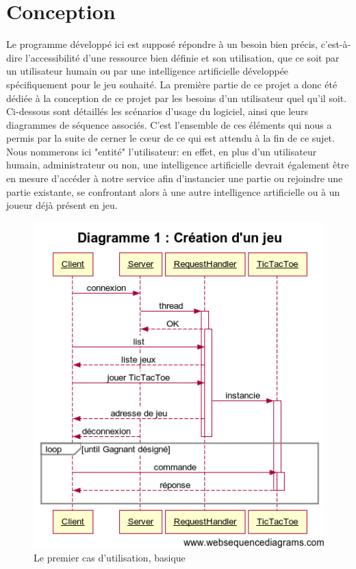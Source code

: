 \chapter{Conception}

Le programme développé ici est supposé répondre à un besoin bien précis, c'est-à-dire l'accessibilité d'une ressource bien définie et son utilisation, que ce soit par un utilisateur humain ou par une intelligence artificielle développée spécifiquement pour le jeu souhaité. La première partie de ce projet a donc été dédiée à la conception de ce projet par les besoins d'un utilisateur quel qu'il soit.\\

Ci-dessous sont détaillés les scénarios d'usage du logiciel, ainsi que leurs diagrammes de séquence associés. C'est l'ensemble de ces éléments qui nous a permis par la suite de cerner le cœur de ce qui est attendu à la fin de ce sujet.\\

Nous nommerons ici "entité" l'utilisateur: en effet, en plus d'un utilisateur humain, administrateur ou non, une intelligence artificielle devrait également être en mesure d'accéder à notre service afin d'instancier une partie ou rejoindre une partie existante, se confrontant alors à une autre intelligence artificielle ou à un joueur déjà présent en jeu.\\

\newpage
\begin{figure}[!ht]
	\center
	\includegraphics[scale=0.7]{images/sequence/diagramme_scenario1.png}
	\caption{Le premier cas d'utilisation, basique}
\end{figure}

